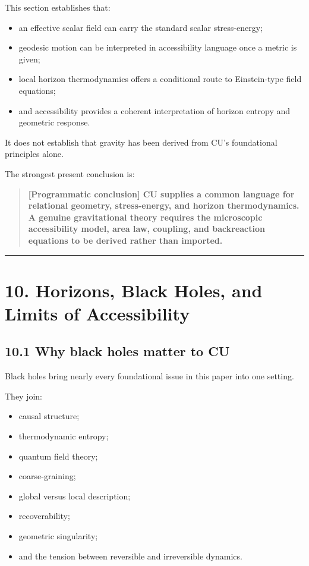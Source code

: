 \documentclass[
  11pt,
]{article}
\providecommand{\tightlist}{%
  \setlength{\itemsep}{0pt}\setlength{\parskip}{0pt}}
\begin{document}
This section establishes that:

\begin{itemize}
\tightlist
\item
  an effective scalar field can carry the standard scalar stress-energy;
\item
  geodesic motion can be interpreted in accessibility language once a
  metric is given;
\item
  local horizon thermodynamics offers a conditional route to
  Einstein-type field equations;
\item
  and accessibility provides a coherent interpretation of horizon
  entropy and geometric response.
\end{itemize}

It does not establish that gravity has been derived from CU's
foundational principles alone.

The strongest present conclusion is:

\begin{quote}
\textbf{{[}Programmatic conclusion{]} CU supplies a common language for
relational geometry, stress-energy, and horizon thermodynamics. A
genuine gravitational theory requires the microscopic accessibility
model, area law, coupling, and backreaction equations to be derived
rather than imported.}
\end{quote}

\begin{center}\rule{0.5\linewidth}{0.5pt}\end{center}

\section{10. Horizons, Black Holes, and Limits of
Accessibility}\label{horizons-black-holes-and-limits-of-accessibility}

\subsection{10.1 Why black holes matter to
CU}\label{why-black-holes-matter-to-cu}

Black holes bring nearly every foundational issue in this paper into one
setting.

They join:

\begin{itemize}
\tightlist
\item
  causal structure;
\item
  thermodynamic entropy;
\item
  quantum field theory;
\item
  coarse-graining;
\item
  global versus local description;
\item
  recoverability;
\item
  geometric singularity;
\item
  and the tension between reversible and irreversible dynamics.
\end{itemize}
\end{document}
